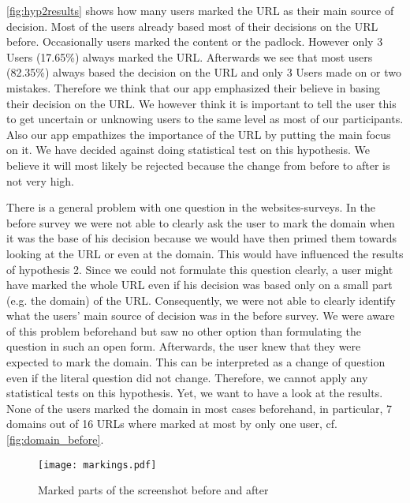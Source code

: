 \begin{description}[leftmargin=0cm]
\item[Hypothesis 2]
\autoref{fig:hyp2results} shows how many users marked the URL as their main source of decision.
Most of the users already based most of their decisions on the URL before.
Occasionally users marked the content or the padlock.
However only 3 Users (17.65\%) always marked the URL.
Afterwards we see that most users (82.35\%) always based the decision on the URL and only 3 Users made on or two mistakes.
Therefore we think that our app emphasized their believe in basing their decision on the URL.
We however think it is important to tell the user this to get uncertain or unknowing users to the same level as most of our participants.
Also our app empathizes the importance of the URL by putting the main focus on it.
We have decided against doing statistical test on this hypothesis.
We believe it will most likely be rejected because the change from before to after is not very high.
\item[Hypothesis 3]
There is a general problem with one question in the websites-surveys.
In the before survey we were not able to clearly ask the user to mark the domain when it was the base of his decision because we would have then primed them towards looking at the URL or even at the domain.
This would have influenced the results of hypothesis 2.
Since we could not formulate this question clearly, a user might have marked the whole URL even if his decision was based only on a small part (e.g. the domain) of the URL.
Consequently, we were not able to clearly identify what the users' main source of decision was in the before survey.
We were aware of this problem beforehand but saw no other option than formulating the question in such an open form.
Afterwards, the user knew that they were expected to mark the domain.
This can be interpreted as a change of question even if the literal question did not change.
Therefore, we cannot apply any statistical tests on this hypothesis.
Yet, we want to have a look at the results.
None of the users marked the domain in most cases beforehand, in particular, 7 domains out of 16 URLs where marked at most by only one user, cf. \autoref{fig:domain_before}.
\begin{figure}
\centering
\texttt{[image: markings.pdf]}
\caption{Marked parts of the screenshot before and after}
\label{fig:markings}
\end{figure}


\end{description}
